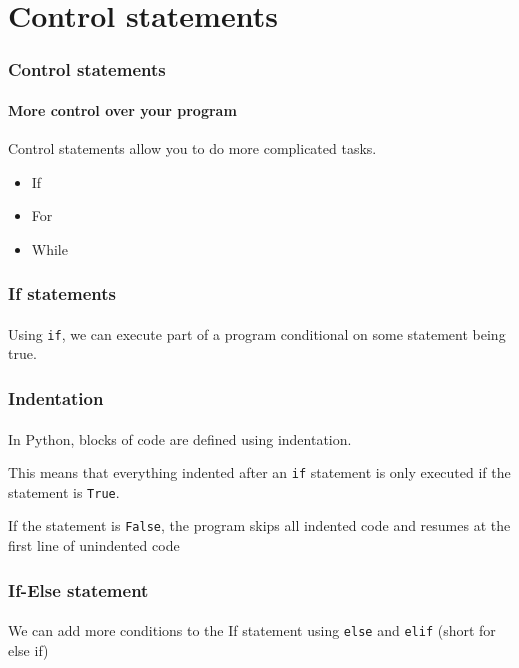 \section{Control statements} %
\label{sec:control_statements}

\begin{frame}\frametitle{Control statements}
    \framesubtitle{More control over your program}

    Control statements allow you to do more complicated tasks.

    \begin{itemize}
        \item If
        \item For
        \item While
    \end{itemize}


\end{frame}

\begin{frame}\frametitle{If statements}
    \framesubtitle{}

    Using \texttt{if}, we can execute part of a program conditional on some statement
    being true.


\end{frame}

\begin{frame}\frametitle{Indentation}
    \framesubtitle{}

    In Python, blocks of code are defined using indentation.

    \vfill

    This means that everything indented after an \texttt{if} statement
    is only executed if the statement is \texttt{True}.

    If the statement is \texttt{False}, the program skips all indented code
    and resumes at the first line of unindented code


\end{frame}

\begin{frame}\frametitle{If-Else statement}
    \framesubtitle{}

    We can add more conditions to the If statement using \texttt{else} and
    \texttt{elif} (short for else if)


\end{frame}

